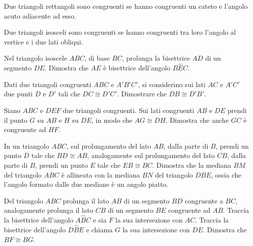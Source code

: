 \begin{multicols}{2}
\begin{esercizio}
\label{ese:2.9}
Due triangoli rettangoli sono congruenti se hanno congruenti un cateto e l'angolo acuto adiacente ad esso.
\end{esercizio}

\begin{esercizio}
\label{ese:2.10}
Due triangoli isosceli sono congruenti se hanno congruenti tra loro l'angolo al vertice e i due lati obliqui.
\end{esercizio}

\begin{esercizio}
\label{ese:2.11}
Nel triangolo isoscele $ABC$, di base $BC$, prolunga la bisettrice $AD$ di un segmento $DE$. Dimostra che $AE$ è bisettrice dell'angolo $B\widehat{E}C$.
\end{esercizio}

\begin{esercizio}
\label{ese:2.12}
Dati due triangoli congruenti $ABC$ e $A'B'C'$, si considerino sui lati $AC$ e $A'C'$ due punti $D$ e $D'$ tali che $DC\cong D'C'$.  Dimostrare che $DB\cong D'B'$.
\end{esercizio}

\begin{esercizio}
\label{ese:2.13}
Siano $ABC$ e $DEF$ due triangoli congruenti. Sui lati congruenti $AB$ e $DE$ prendi il punto $G$ su $AB$ e $H$ su $DE$, in modo che $AG\cong DH$. Dimostra che anche $GC$ è congruente ad $HF$.
\end{esercizio}

\begin{esercizio}
\label{ese:2.14}
In un triangolo $ABC$, sul prolungamento del lato $AB$, dalla parte di $B$, prendi un punto $D$ tale che $BD\cong AB$, analogamente sul prolungamento del lato $CB$, dalla parte di $B$, prendi un punto $E$ tale che $EB\cong BC$. Dimostra che la mediana $BM$ del triangolo $ABC$ è allineata con la mediana $BN$ del triangolo $DBE$, ossia che l'angolo formato dalle due mediane è un angolo piatto.
\end{esercizio}

\begin{esercizio}
\label{ese:2.15}
Del triangolo $ABC$ prolunga il lato $AB$ di un segmento $BD$ congruente a $BC$, analogamente prolunga il lato $CB$ di un segmento $BE$ congruente ad $AB$. Traccia la bisettrice dell'angolo $A\widehat{B}C$ e sia $F$ la sua intersezione con $AC$. Traccia la bisettrice dell'angolo $D\widehat{B}E$ e chiama $G$ la sua intersezione con $DE$. Dimostra che $BF\cong BG$.
\end{esercizio}


\end{multicols}
